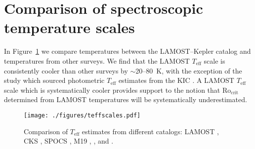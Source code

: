 \documentclass[linenumbers,tighten,trackchanges,twocolumn]{aastex631}
\newcommand{\rocrit}{$\mathrm{Ro_{crit}}$\xspace}
\newcommand{\teff}{\ensuremath{T_{\mathrm{eff}}}\xspace}
\begin{document}
\section{Comparison of spectroscopic temperature scales}\label{app:teff}

In Figure~\ref{fig:teffscales} we compare temperatures between the LAMOST--Kepler catalog and temperatures from other surveys. We find that the LAMOST \teff scale is consistently cooler than other surveys by $\sim$20--80~K, with the exception of the \citet{McQuillan2014} study which sourced photometric \teff estimates from the KIC \citep{Brown2011}. A LAMOST \teff scale which is systematically cooler provides support to the notion that \rocrit determined from LAMOST temperatures will be systematically underestimated. 

\begin{figure}
    \centering
    \texttt{[image: ./figures/teffscales.pdf]}
    \caption{Comparison of \teff estimates from different catalogs: LAMOST \citep{Xiang2019}, CKS \citep{Fulton2018}, SPOCS \citep{Brewer2018}, M19 \citep{Martinez2019}, \citet{McQuillan2014}, and \citet{Hall2021}.}
    \label{fig:teffscales}
\end{figure}
\end{document}
